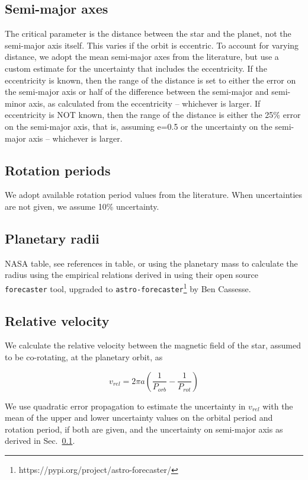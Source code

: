 \documentclass[twocolumn]{aastex631}
\begin{document}
\subsection{Semi-major axes}
\label{sec:data:a}
The critical parameter is the distance between the star and the planet, not the semi-major axis itself. This varies if the orbit is eccentric. To account for varying distance, we adopt the mean semi-major axes from the literature, but use a custom estimate for the uncertainty that includes the eccentricity.
If the eccentricity is known, then the range of the distance is set to either the error on the semi-major axis or half of the difference between the semi-major and semi-minor axis, as calculated from the eccentricity -- whichever is larger. If eccentricity is NOT known, then the range of the distance is either the 25\% error on the semi-major axis, that is, assuming e=0.5 or the uncertainty on the semi-major axis -- whichever is larger.

\subsection{Rotation periods}
We adopt available rotation period values from the literature. When uncertainties are not given, we assume 10\% uncertainty.%

\subsection{Planetary radii}
NASA table, see references in table, or using the planetary mass to calculate the radius using the empirical relations derived in \cite{chen2007} using their open source \texttt{forecaster} tool, upgraded to \texttt{astro-forecaster}\footnote{https://pypi.org/project/astro-forecaster/} by Ben Cassesse. 

\subsection{Relative velocity}

We calculate the relative velocity between the magnetic field of the star, assumed to be co-rotating, at the planetary orbit, as

\begin{equation}
    v_{rel} = 2 \pi a \left(\dfrac{1}{P_{orb}} - \dfrac{1}{P_{rot}}\right) 
\end{equation}

We use quadratic error propagation to estimate the uncertainty in $v_{rel}$ with the mean of the upper and lower uncertainty values on the orbital period and rotation period, if both are given, and the uncertainty on semi-major axis as derived in Sec.~\ref{sec:data:a}. 
\end{document}
